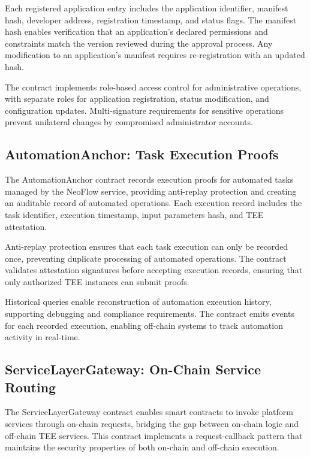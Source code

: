 \documentclass[11pt,a4paper]{article}
\begin{document}
Each registered application entry includes the application identifier, manifest hash, developer address, registration timestamp, and status flags. The manifest hash enables verification that an application's declared permissions and constraints match the version reviewed during the approval process. Any modification to an application's manifest requires re-registration with an updated hash.

The contract implements role-based access control for administrative operations, with separate roles for application registration, status modification, and configuration updates. Multi-signature requirements for sensitive operations prevent unilateral changes by compromised administrator accounts.

\subsection{AutomationAnchor: Task Execution Proofs}

The AutomationAnchor contract records execution proofs for automated tasks managed by the NeoFlow service, providing anti-replay protection and creating an auditable record of automated operations. Each execution record includes the task identifier, execution timestamp, input parameters hash, and TEE attestation.

Anti-replay protection ensures that each task execution can only be recorded once, preventing duplicate processing of automated operations. The contract validates attestation signatures before accepting execution records, ensuring that only authorized TEE instances can submit proofs.

Historical queries enable reconstruction of automation execution history, supporting debugging and compliance requirements. The contract emits events for each recorded execution, enabling off-chain systems to track automation activity in real-time.

\subsection{ServiceLayerGateway: On-Chain Service Routing}

The ServiceLayerGateway contract enables smart contracts to invoke platform services through on-chain requests, bridging the gap between on-chain logic and off-chain TEE services. This contract implements a request-callback pattern that maintains the security properties of both on-chain and off-chain execution.
\end{document}
